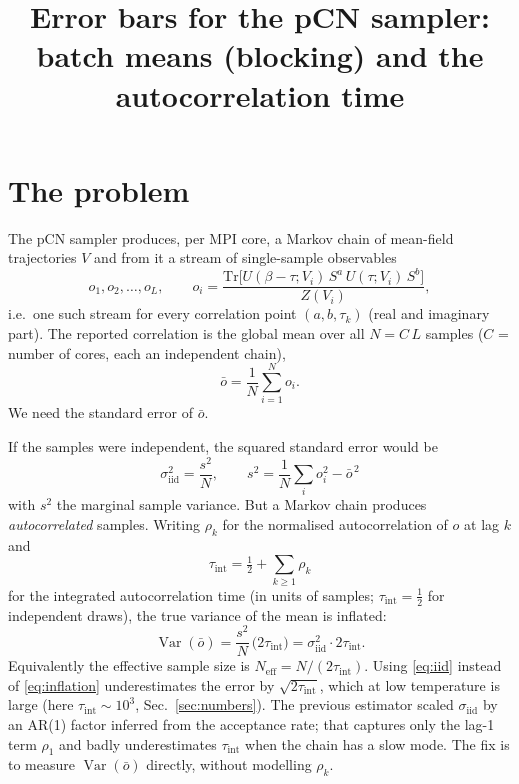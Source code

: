 \documentclass[11pt]{article}
\title{Error bars for the pCN sampler: batch means (blocking) and the autocorrelation time}
\date{}
\newcommand{\Tr}{\mathrm{Tr}}
\newcommand{\Var}{\operatorname{Var}}
\newcommand{\tauint}{\tau_{\mathrm{int}}}
\begin{document}
\maketitle

\section{The problem}

The pCN sampler produces, per MPI core, a Markov chain of mean-field trajectories
$V$ and from it a stream of single-sample observables
\[
  o_1, o_2, \dots, o_L ,
\qquad
  o_i = \frac{\Tr\!\big[U(\beta-\tau;V_i)\,S^a\,U(\tau;V_i)\,S^b\big]}{Z(V_i)} ,
\]
i.e.\ one such stream for every correlation point $(a,b,\tau_k)$ (real and
imaginary part). The reported correlation is the global mean over all
$N = C\,L$ samples ($C$ = number of cores, each an independent chain),
\[
  \bar o = \frac1N \sum_{i=1}^{N} o_i .
\]
We need the standard error of $\bar o$.

If the samples were independent, the squared standard error would be
\begin{equation}
  \sigma_{\mathrm{iid}}^2 = \frac{s^2}{N},
  \qquad
  s^2 = \frac1{N}\sum_i o_i^2 - \bar o^{\,2}
  \label{eq:iid}
\end{equation}
with $s^2$ the marginal sample variance. But a Markov chain produces
\emph{autocorrelated} samples. Writing $\rho_k$ for the normalised
autocorrelation of $o$ at lag $k$ and
\begin{equation}
  \tauint = \tfrac12 + \sum_{k\ge 1}\rho_k
  \label{eq:tauint-def}
\end{equation}
for the integrated autocorrelation time (in units of samples; $\tauint=\tfrac12$
for independent draws), the true variance of the mean is inflated:
\begin{equation}
  \Var(\bar o) = \frac{s^2}{N}\,\big(2\tauint\big)
  = \sigma_{\mathrm{iid}}^2 \cdot 2\tauint .
  \label{eq:inflation}
\end{equation}
Equivalently the effective sample size is $N_{\mathrm{eff}} = N/(2\tauint)$.
Using \eqref{eq:iid} instead of \eqref{eq:inflation} underestimates the error by
$\sqrt{2\tauint}$, which at low temperature is large (here $\tauint\sim10^3$,
Sec.~\ref{sec:numbers}). The previous estimator scaled $\sigma_{\mathrm{iid}}$ by
an AR(1) factor inferred from the acceptance rate; that captures only the lag-1
term $\rho_1$ and badly underestimates $\tauint$ when the chain has a slow mode.
The fix is to measure $\Var(\bar o)$ directly, without modelling $\rho_k$.
\end{document}
